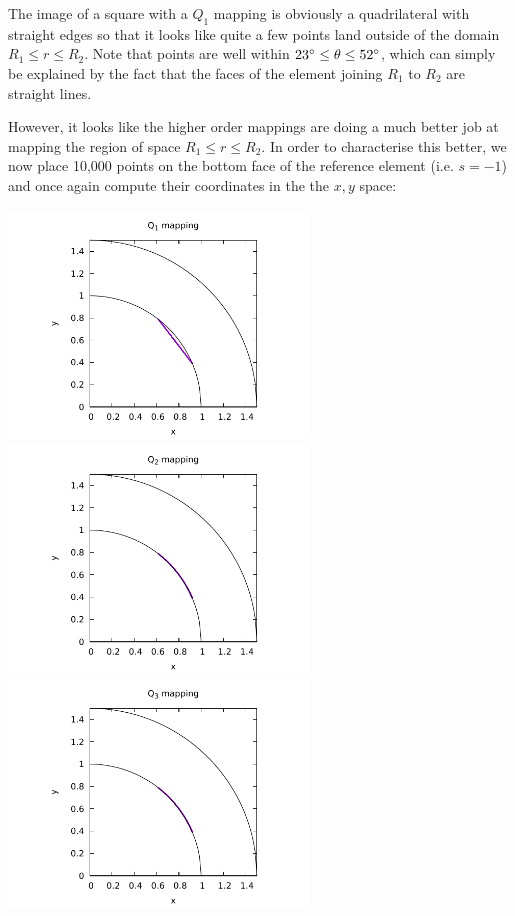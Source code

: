 The image of a square with a $Q_1$ mapping is obviously a quadrilateral with 
straight edges so that it looks like quite a few points land outside of the domain $R_1\leq r\leq R_2$.
Note that points are well within $23\degree \leq \theta \leq 52\degree$, which can 
simply be explained by the fact that the faces of the element joining $R_1$
to $R_2$ are straight lines.

However, it looks like the higher order mappings are doing a much better 
job at mapping the region of space $R_1\leq r\leq R_2$. In order to characterise 
this better, we now place 10,000 points on the bottom face of 
the reference element (i.e. $s=-1$)
and once again compute their coordinates in the the $x,y$ space:

\begin{center}
\includegraphics[width=8cm]{images/mappings/curved/xy1_line.pdf}
\includegraphics[width=8cm]{images/mappings/curved/xy2_line.pdf}\\
\includegraphics[width=8cm]{images/mappings/curved/xy3_line.pdf}

\end{center}
